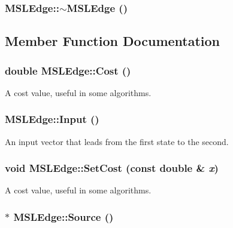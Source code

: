 \subsubsection{\setlength{\rightskip}{0pt plus 5cm}MSLEdge::$\sim$MSLEdge ()\hspace{0.3cm}{\tt  [inline]}}\label{class_MSLEdge_a4}




\subsection{Member Function Documentation}
\subsubsection{\setlength{\rightskip}{0pt plus 5cm}double MSLEdge::Cost ()\hspace{0.3cm}{\tt  [inline]}}\label{class_MSLEdge_a6}


A cost value, useful in some algorithms.

\subsubsection{ MSLEdge::Input ()\hspace{0.3cm}{\tt  [inline]}}\label{class_MSLEdge_a8}


An input vector that leads from the first state to the second.

\subsubsection{\setlength{\rightskip}{0pt plus 5cm}void MSLEdge::Set\-Cost (const double \& {\em x})\hspace{0.3cm}{\tt  [inline]}}\label{class_MSLEdge_a7}


A cost value, useful in some algorithms.

\subsubsection{ $\ast$ MSLEdge::Source ()\hspace{0.3cm}{\tt  [inline]}}\label{class_MSLEdge_a9}


